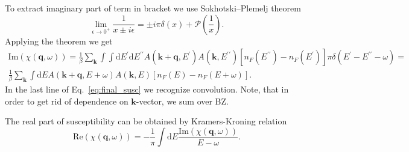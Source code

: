 \documentclass[preprint,prb,amsmath,superscriptaddress,showpacs]{revtex4}
\begin{document}
%
To extract imaginary part of term in bracket we use Sokhotski–Plemelj
theorem
%
\begin{equation}
\lim_{\epsilon \rightarrow 0^{+}} \frac{1}{x \pm i\epsilon} = \pm
i\pi\delta (x) + \mathcal{P}\left( \frac{1}{x} \right).
\end{equation}
%
Applying the theorem we get
%
\begin{equation}
    \begin{gathered}
 \mathrm{Im} (\chi(\mathbf{q}, \omega)) =  \frac{1}{\beta} \sum_{\mathbf{k}} \int \int
      \mathrm{d}E^{\prime} \mathrm{d}E^{\prime \prime} A(\mathbf{k} +
      \mathbf{q}, E^{\prime}) A(\mathbf{k}, E^{\prime \prime}) \left[
        n_F(E^{\prime \prime}) - n_F(E^{\prime}) \right] \pi
      \delta(E^{\prime} - E^{\prime \prime} - \omega) = \\
       \frac{1}{\beta} \sum_{\mathbf{k}} \int
      \mathrm{d}E A(\mathbf{k} +
      \mathbf{q}, E + \omega) A(\mathbf{k}, E) \left[
        n_F(E) - n_F(E + \omega) \right].
    \end{gathered}
    \label{eq:final_susc}
\end{equation}
%
In the last line of Eq.~\eqref{eq:final_susc} we recognize convolution. Note, that in order to get rid of dependence on $\mathbf{k}$-vector,
we sum over BZ.

The real part of susceptibility can be obtained by
Kramers-Kroning relation
%
\begin{equation}
\mathrm{Re} (\chi(\mathbf{q}, \omega)) = - \frac{1}{\pi} \int
\mathrm{d} E \frac{\mathrm{Im} (\chi(\mathbf{q}, \omega))}{E - \omega}.
\end{equation}
%

\iffalse
Using RPA approximation we can further write spectral function
$A(\mathbf{k}, E)$ as
%
\begin{equation}
A(\mathbf{k}, E) = - \frac{1}{\pi} \mathrm{Im} (G_{\mathrm{ret}}(\mathbf{k}, E)) =
\frac{1}{\pi} \frac{-\mathrm{Im}(\Sigma)}{\left( E -
    \varepsilon_{\mathbf{k}} + \mu - \mathrm{Re}(\Sigma) \right)^2 + (\mathrm{Im}(\Sigma))^2}.
\end{equation}
%
Here, $\Sigma$ marks RPA self-energy.
\fi
\end{document}

